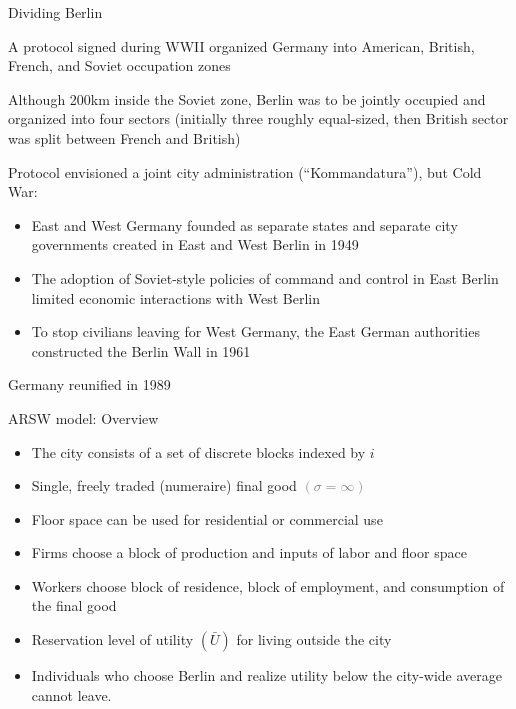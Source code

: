 \documentclass[11pt,notes=hide,aspectratio=169]{beamer}
\begin{document}
\begin{frame}{Dividing Berlin}
\begin{itemize}
{\small
\item A protocol signed during WWII organized Germany into American, British, French, and Soviet occupation zones
\item Although 200km inside the Soviet zone, Berlin was to be jointly occupied and organized into four sectors (initially three roughly equal-sized, then British sector was split between French and British)
\item Protocol envisioned a joint city administration (``Kommandatura''), but Cold War:
	\begin{itemize}
	\item East and West Germany founded as separate states and separate city governments created in East and West Berlin in 1949
	\item The adoption of Soviet-style policies of command and control in East Berlin limited economic interactions with West Berlin
	\item To stop civilians leaving for West Germany, the East German authorities constructed the Berlin Wall in 1961
	\end{itemize}
\item Germany reunified in 1989
}
\end{itemize}
\end{frame}
\begin{frame}{ARSW model: Overview}
\begin{itemize}
\item The city consists of a set of discrete blocks indexed by $i$ 
\item Single, freely traded (numeraire) final good \textcolor{gray}{$(\sigma = \infty)$}
\item Floor space can be used for residential or commercial use
\item Firms choose a block of production and inputs of labor and floor space 
\item Workers choose block of residence, block of employment, and consumption of the final good 
\item Reservation level of utility $(\bar{U})$ for living outside the city
\item[] {\small Individuals who choose Berlin and realize utility below the city-wide average cannot leave.\par}
\end{itemize}
\end{frame}
\end{document}
